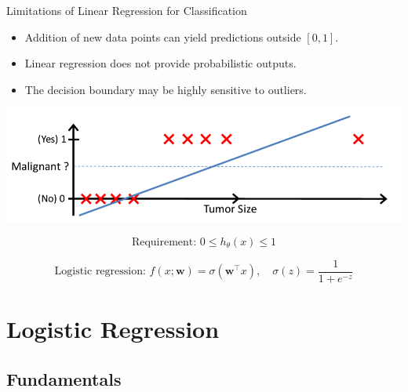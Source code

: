 \documentclass[serif, aspectratio=169]{beamer}
\begin{document}
    \begin{frame}{Limitations of Linear Regression for Classification}
        \begin{itemize}
            \item Addition of new data points can yield predictions outside $[0,1]$.
            \item Linear regression does not provide probabilistic outputs.
            \item The decision boundary may be highly sensitive to outliers.
        \end{itemize}

        \vspace{0.5em}
        \centering
        \includegraphics[width=0.68\linewidth]{pic/lrClassification2.png}

        \[
            \text{Requirement: } 0 \le h_\theta(x) \le 1
        \]

        \[
            \text{Logistic regression: } f(x;\mathbf{w}) = \sigma(\mathbf{w}^\top x), \quad \sigma(z) = \frac{1}{1+e^{-z}}
        \]
    \end{frame}




    \section{Logistic Regression}

    \subsection{Fundamentals}
\end{document}
